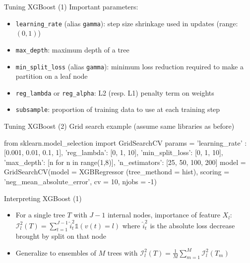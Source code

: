 \documentclass{beamer}
\begin{document}
    \begin{frame}{Tuning XGBoost (1)}
        Important parameters:
        \begin{itemize}
            \item \texttt{learning\_rate} (alias \texttt{gamma}): step size shrinkage used in updates (range: $(0,1)$)
            \item \texttt{max\_depth}: maximum depth of a tree
            \item \texttt{min\_split\_loss} (alias \texttt{gamma}): minimum loss reduction required to make a partition on a leaf node
            \item \texttt{reg\_lambda} or \texttt{reg\_alpha}: L2 (resp. L1) penalty term on weights
            \item \texttt{subsample}: proportion of training data to use at each training step
        \end{itemize}
    \end{frame}

    \begin{frame}[fragile]{Tuning XGBoost (2)}
        Grid search example (assume same libraries as before)
        \begin{python}
        from sklearn.model_selection import GridSearchCV
        params = { 'learning_rate' : [0.001, 0.01, 0.1, 1],
                   'reg_lambda': [0, 1, 10],
                   'min_split_loss': [0, 1, 10],
                   'max_depth': [n for n in range(1,8)],
                   'n_estimators': [25, 50, 100, 200]
        }
        model = GridSearchCV(model = XGBRegressor
                            (tree_methond = hist),
                            scoring = 
                            'neg_mean_absolute_error',
                            cv = 10, njobs = -1)
        \end{python}
    \end{frame}

    \begin{frame}{Interpreting XGBoost (1)}
        \begin{itemize}
            \item For a single tree $T$ with $J-1$ internal nodes, \alert{importance} of feature $X_{l}$: $\mathcal{I}_{l}^2(T) = \sum_{t=1}^{J-1} \hat{i}_t^2 \mathds{1} (v(t) = l)$ where $\hat{i}_t^2$ is the absolute loss decrease brought by split on that node
            \item Generalize to ensembles of $M$ trees with $\mathcal{I}_{l}^2(T) = \frac{1}{M} \sum_{m=1}^M \mathcal{I}_{l}^2(T_m) $
        \end{itemize}
    \end{frame}
\end{document}
